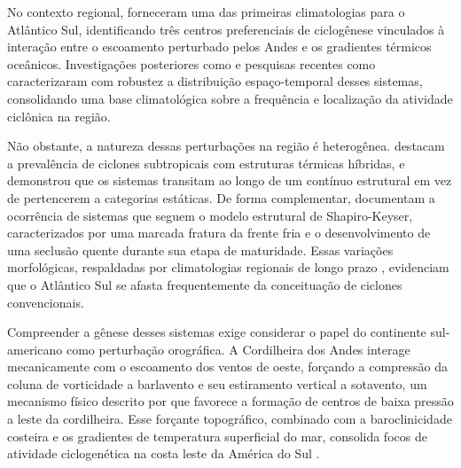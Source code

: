 No contexto regional, \citet{reboita2010south} forneceram uma das primeiras climatologias para o Atlântico Sul, identificando três centros preferenciais de ciclogênese vinculados à interação entre o escoamento perturbado pelos Andes e os gradientes térmicos oceânicos. Investigações posteriores como \citet{gramcianinov2020analysis} e pesquisas recentes como \citet{padilhareinke2026characterization} caracterizaram com robustez a distribuição espaço-temporal desses sistemas, consolidando uma base climatológica sobre a frequência e localização da atividade ciclônica na região.

Não obstante, a natureza dessas perturbações na região é heterogênea. \citet{evans2012climatology} destacam a prevalência de ciclones subtropicais com estruturas térmicas híbridas, e \citet{hart2003cyclone} demonstrou que os sistemas transitam ao longo de um contínuo estrutural em vez de pertencerem a categorias estáticas. De forma complementar, \citet{gozzo2013air} documentam a ocorrência de sistemas que seguem o modelo estrutural de Shapiro-Keyser, caracterizados por uma marcada fratura da frente fria e o desenvolvimento de uma seclusão quente durante sua etapa de maturidade. Essas variações morfológicas, respaldadas por climatologias regionais de longo prazo \citep{gozzo2014subtropical}, evidenciam que o Atlântico Sul se afasta frequentemente da conceituação de ciclones convencionais.

Compreender a gênese desses sistemas exige considerar o papel do continente sul-americano como perturbação orográfica. A Cordilheira dos Andes interage mecanicamente com o escoamento dos ventos de oeste, forçando a compressão da coluna de vorticidade a barlavento e seu estiramento vertical a sotavento, um mecanismo físico descrito por \citet{gan1994influence} que favorece a formação de centros de baixa pressão a leste da cordilheira. Esse forçante topográfico, combinado com a baroclinicidade costeira e os gradientes de temperatura superficial do mar, consolida focos de atividade ciclogenética na costa leste da América do Sul \citep{reboita2026meteorology}.

